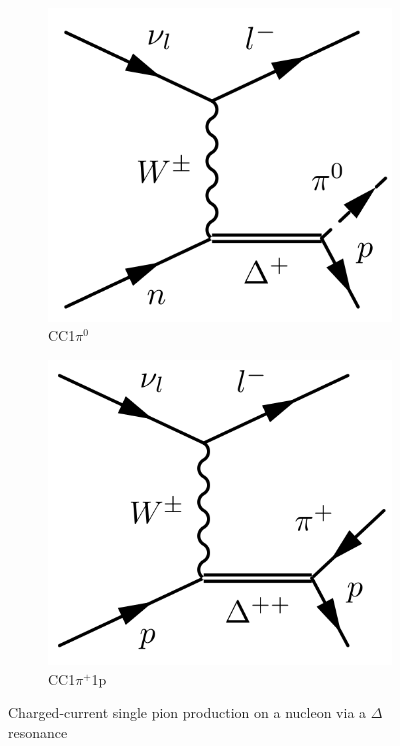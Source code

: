 \begin{figure}[h]
\begin{subfigure}[t]{0.32\textwidth}
		\includegraphics[width=\textwidth, trim={0mm 0mm 0mm 0mm}, clip,page=1]{figures/niwg/diagrams/CC1pi0}
		\caption{CC1$\pi^0$}
	\end{subfigure}
	\begin{subfigure}[t]{0.32\textwidth}
		\includegraphics[width=\textwidth, trim={0mm 0mm 0mm 0mm}, clip,page=1]{figures/niwg/diagrams/CC1ppip}
		\caption{CC1$\pi^+$1p}
	\end{subfigure}
	\caption{Charged-current single pion production on a nucleon via a $\Delta$ resonance}
	\label{fig:1pi_diags}
\end{figure}

